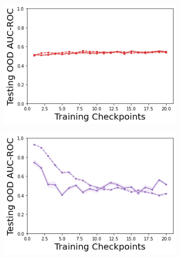\begin{figure}
    \begin{subfigure}{.245\textwidth}
        \includegraphics[width=\textwidth]{sections/011_icml2022/resources/DropOut-CartPoleOOD-v0-AUC-ROC-epistemic_-testing-strategy.png}
    \end{subfigure}
    \begin{subfigure}{.245\textwidth}
        \includegraphics[width=\textwidth]{sections/011_icml2022/resources/Ensemble-CartPoleOOD-v0-AUC-ROC-epistemic_-testing-strategy.png}
    \end{subfigure}
    \begin{subfigure}{.245\textwidth}

\end{subfigure}
\end{figure}
